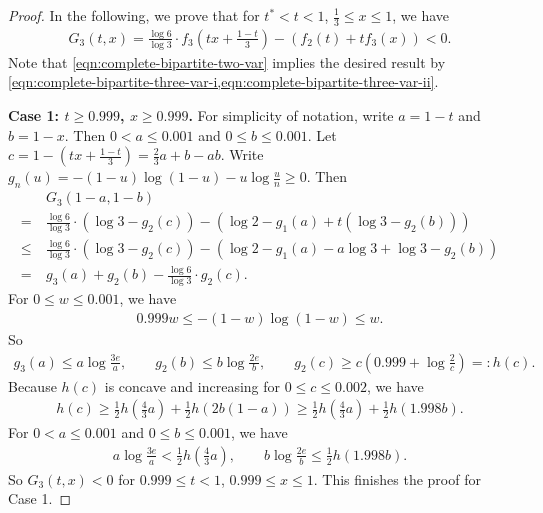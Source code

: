 \documentclass[11pt]{article}
\theoremstyle{definition}
\begin{document}
\begin{proof}
  In the following, we prove that for $t^* < t < 1$, $\frac 13 \le x \le 1$, we have
  \begin{align} \label{eqn:complete-bipartite-two-var}
    G_3(t,x) = \frac{\log 6}{\log 3} \cdot f_3\left(t x+\frac{1-t}{3}\right) - (f_2(t) + t f_3(x)) < 0.
  \end{align}
  Note that \cref{eqn:complete-bipartite-two-var} implies the desired result by \cref{eqn:complete-bipartite-three-var-i,eqn:complete-bipartite-three-var-ii}.

  \textbf{Case 1: $t\ge 0.999$, $x\ge 0.999$.}
  For simplicity of notation, write $a = 1-t$ and $b=1-x$.
  Then $0<a\le 0.001$ and $0\le b\le 0.001$.
  Let $c = 1-\left(t x + \frac{1-t}3\right) = \frac 23a +b -ab$.
  Write $g_n(u) = -(1-u)\log(1-u) - u \log \frac un \ge 0$.
  Then
  \begin{align}
    &~ G_3(1-a,1-b) \\
    \nonumber =&~
    \frac{\log 6}{\log 3} \cdot \left(\log 3 - g_2(c) \right) - (\log 2 - g_1(a) + t ( \log 3 - g_2(b))) \\
    \nonumber \le&~ \frac{\log 6}{\log 3} \cdot \left(\log 3 - g_2(c) \right) - (\log 2 - g_1(a) - a \log 3 + \log 3 - g_2(b)) \\
    \nonumber =&~ g_3(a) + g_2(b) - \frac{\log 6}{\log 3} \cdot g_2(c).
  \end{align}
  For $0\le w\le 0.001$, we have
  \begin{align}
    0.999 w \le -(1-w)\log(1-w) \le w.
  \end{align}
  So
  \begin{align}
    g_3(a) \le a \log \frac{3e} a, \qquad
    g_2(b) \le b \log \frac{2e} b, \qquad
    g_2(c) \ge c \left(0.999 + \log \frac 2c\right) =: h(c).
  \end{align}
  Because $h(c)$ is concave and increasing for $0\le c\le 0.002$, we have
  \begin{align}
    h(c) \ge \frac 12 h\left(\frac 43 a\right) + \frac 12 h(2b(1-a)) \ge \frac 12 h\left(\frac 43 a\right) + \frac 12 h(1.998 b).
  \end{align}
  For $0<a\le 0.001$ and $0\le b\le 0.001$, we have
  \begin{align}
    a \log \frac{3e} a < \frac 12 h\left(\frac 43 a\right), \qquad
    b \log \frac{2e} b \le \frac 12 h(1.998 b).
  \end{align}
  So $G_3(t,x) < 0$ for $0.999 \le t < 1$, $0.999\le x\le 1$.
  This finishes the proof for Case 1.


\end{proof}
\end{document}
